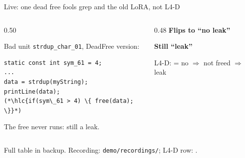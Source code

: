 \begin{frame}[fragile]{Live: one dead free fools grep and the old LoRA, not L4-D}
  \begin{columns}[T]
    \begin{column}{0.50\textwidth}
      {\small Bad unit \texttt{strdup\_char\_01}, DeadFree version:\par}
\begin{lstlisting}[style=unit]
static const int sym_61 = 4;
...
data = strdup(myString);
printLine(data);
(*\hlc{if(sym\_61 > 4) \{ free(data); \}}*)
\end{lstlisting}
      {\small The free never runs: still a leak.\par}
    \end{column}
    \begin{column}{0.48\textwidth}
      \textcolor{OIvermil}{\textbf{Flips to ``no leak''}}\\
      {\small {}\par}
      \vspace{6pt}
      \textcolor{OIblue}{\textbf{Still ``leak''}}\\
      {\small {}\par}
      \vspace{6pt}
      {\small L4-D:  = no $\Rightarrow$ not freed $\Rightarrow$ leak\par}
    \end{column}
  \end{columns}
  \vfill
  {\scriptsize Full table in backup. Recording: \texttt{demo/recordings/}; L4-D row: .\par}
\end{frame}
